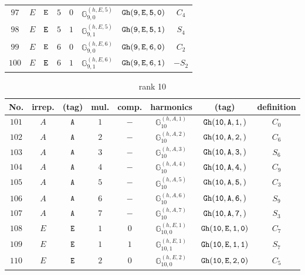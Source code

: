 \documentclass[fleqn,8pt]{jsarticle}
\begin{document}
\begin{table}[ht!]
\begin{center}
\begin{tabular}{cccccccc}
$ 97 $ & $ E $ & $ {\tt E} $ & $ 5 $ & $ 0 $ & $ \mathbb{G}_{9,0}^{(h,E,5)} $ & $ {\tt Gh(9,E,5,0)} $ & $ C_{4} $ \\
$ 98 $ & $ E $ & $ {\tt E} $ & $ 5 $ & $ 1 $ & $ \mathbb{G}_{9,1}^{(h,E,5)} $ & $ {\tt Gh(9,E,5,1)} $ & $ S_{4} $ \\
$ 99 $ & $ E $ & $ {\tt E} $ & $ 6 $ & $ 0 $ & $ \mathbb{G}_{9,0}^{(h,E,6)} $ & $ {\tt Gh(9,E,6,0)} $ & $ C_{2} $ \\
$ 100 $ & $ E $ & $ {\tt E} $ & $ 6 $ & $ 1 $ & $ \mathbb{G}_{9,1}^{(h,E,6)} $ & $ {\tt Gh(9,E,6,1)} $ & $ - S_{2} $ \\
 \hline \hline
\end{tabular}
\end{center}
\end{table}
\begin{table}[ht!]
\begin{center}
\caption{rank 10}
\renewcommand{\arraystretch}{1.3}
\begin{tabular}{cccccccc} \hline \hline
No. & irrep. & (tag) & mul. & comp. & harmonics & (tag) & definition \\ \hline
$ 101 $ & $ A $ & $ {\tt A} $ & $ 1 $ & $ - $ & $ \mathbb{G}_{10}^{(h,A,1)} $ & $ {\tt Gh(10,A,1,)} $ & $ C_{0} $ \\
$ 102 $ & $ A $ & $ {\tt A} $ & $ 2 $ & $ - $ & $ \mathbb{G}_{10}^{(h,A,2)} $ & $ {\tt Gh(10,A,2,)} $ & $ C_{6} $ \\
$ 103 $ & $ A $ & $ {\tt A} $ & $ 3 $ & $ - $ & $ \mathbb{G}_{10}^{(h,A,3)} $ & $ {\tt Gh(10,A,3,)} $ & $ S_{6} $ \\
$ 104 $ & $ A $ & $ {\tt A} $ & $ 4 $ & $ - $ & $ \mathbb{G}_{10}^{(h,A,4)} $ & $ {\tt Gh(10,A,4,)} $ & $ C_{9} $ \\
$ 105 $ & $ A $ & $ {\tt A} $ & $ 5 $ & $ - $ & $ \mathbb{G}_{10}^{(h,A,5)} $ & $ {\tt Gh(10,A,5,)} $ & $ C_{3} $ \\
$ 106 $ & $ A $ & $ {\tt A} $ & $ 6 $ & $ - $ & $ \mathbb{G}_{10}^{(h,A,6)} $ & $ {\tt Gh(10,A,6,)} $ & $ S_{9} $ \\
$ 107 $ & $ A $ & $ {\tt A} $ & $ 7 $ & $ - $ & $ \mathbb{G}_{10}^{(h,A,7)} $ & $ {\tt Gh(10,A,7,)} $ & $ S_{3} $ \\
$ 108 $ & $ E $ & $ {\tt E} $ & $ 1 $ & $ 0 $ & $ \mathbb{G}_{10,0}^{(h,E,1)} $ & $ {\tt Gh(10,E,1,0)} $ & $ C_{7} $ \\
$ 109 $ & $ E $ & $ {\tt E} $ & $ 1 $ & $ 1 $ & $ \mathbb{G}_{10,1}^{(h,E,1)} $ & $ {\tt Gh(10,E,1,1)} $ & $ S_{7} $ \\
$ 110 $ & $ E $ & $ {\tt E} $ & $ 2 $ & $ 0 $ & $ \mathbb{G}_{10,0}^{(h,E,2)} $ & $ {\tt Gh(10,E,2,0)} $ & $ C_{5} $ \\

\end{tabular}
\end{center}
\end{table}
\end{document}
